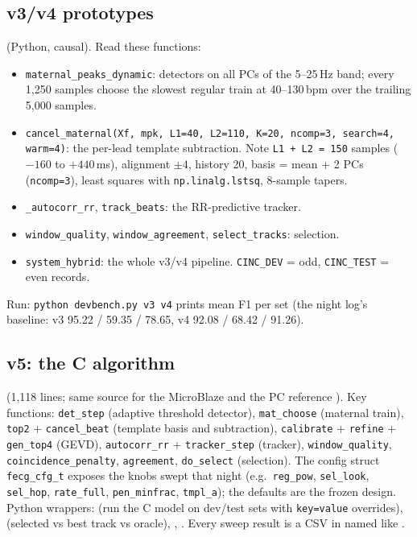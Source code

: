 \documentclass[11pt]{article}
\begin{document}
\subsection{v3/v4 prototypes}
 (Python, causal). Read these functions:
\begin{itemize}
  \item \texttt{maternal\_peaks\_dynamic}: detectors on all PCs of the 5--25\,Hz band; every 1,250 samples choose the slowest regular train at 40--130\,bpm over the trailing 5,000 samples.
  \item \texttt{cancel\_maternal(Xf, mpk, L1=40, L2=110, K=20, ncomp=3, search=4, warm=4)}: the per-lead template subtraction. Note \texttt{L1 + L2 = 150} samples ($-160$ to $+440$\,ms), alignment $\pm 4$, history 20, basis = mean + 2 PCs (\texttt{ncomp=3}), least squares with \texttt{np.linalg.lstsq}, 8-sample tapers.
  \item \texttt{\_autocorr\_rr}, \texttt{track\_beats}: the RR-predictive tracker.
  \item \texttt{window\_quality}, \texttt{window\_agreement}, \texttt{select\_tracks}: selection.
  \item \texttt{system\_hybrid}: the whole v3/v4 pipeline. \texttt{CINC\_DEV} = odd, \texttt{CINC\_TEST} = even records.
\end{itemize}
Run: \texttt{python devbench.py v3 v4} prints mean F1 per set (the night log's baseline: v3 95.22 / 59.35 / 78.65, v4 92.08 / 68.42 / 91.26).

\subsection{v5: the C algorithm}
 (1,118 lines; same source for the MicroBlaze and the PC reference ). Key functions: \texttt{det\_step} (adaptive threshold detector), \texttt{mat\_choose} (maternal train), \texttt{top2} + \texttt{cancel\_beat} (template basis and subtraction), \texttt{calibrate} + \texttt{refine} + \texttt{gen\_top4} (GEVD), \texttt{autocorr\_rr} + \texttt{tracker\_step} (tracker), \texttt{window\_quality}, \texttt{coincidence\_penalty}, \texttt{agreement}, \texttt{do\_select} (selection). The config struct \texttt{fecg\_cfg\_t} exposes the knobs swept that night (e.g.\ \texttt{reg\_pow}, \texttt{sel\_look}, \texttt{sel\_hop}, \texttt{rate\_full}, \texttt{pen\_minfrac}, \texttt{tmpl\_a}); the defaults are the frozen design. Python wrappers:  (run the C model on dev/test sets with \texttt{key=value} overrides),  (selected vs best track vs oracle), , . Every sweep result is a CSV in  named like .
\end{document}
